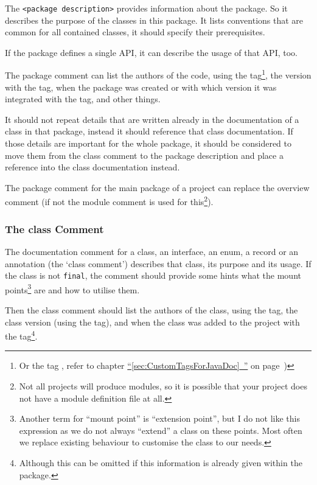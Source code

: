 \documentclass[11pt,a4paper, titlepage, parskip=half, headsepline, footsepline, cleardoublepage=current, headheight=1cm]{scrbook}
\newcommand*{\tqfullvref}[1]{\hyperref[{#1}]{“\ref*{#1}~\nameref*{#1}”} on page~\pageref{#1}}
\begin{document}
The \verb#<package description># provides information about the package. So it describes the purpose of the classes in this package. It lists conventions that are common for all contained classes, it should specify their prerequisites.

If the package defines a single API, it can describe the usage of that API, too. 

The package comment can list the authors of the code, using the  tag\footnote{Or the tag , refer to chapter \tqfullvref{sec:CustomTagsForJavaDoc})}, the version with the  tag, when the package was created or with which version it was integrated with the  tag, and other things.

It should not repeat details that are written already in the documentation of a class in that package, instead it should reference that class documentation. If those details are  important for the whole package, it should be considered to move them from the class comment to the package description and place a reference into the class documentation instead.

The package comment for the main package of a project can replace the overview comment (if not the module comment is used for this\footnote{Not all projects will produce modules, so it is possible that your project does not have a module definition file at all.}).

\subsubsection{The class Comment}\label{sec:ClassComment}
The documentation comment for a class, an interface, an enum, a record or an annotation (the ‘class comment’) describes that class, its purpose and its usage. If the class is not \lstinline|final|, the comment should provide some hints what the mount points\footnote{Another term for “mount point” is “extension point”, but I do not like this expression as we do not always “extend” a class on these points. Most often we replace existing behaviour to customise the class to our needs.} are and how to utilise them.

Then the class comment should list the authors of the class, using the  tag, the class version (using the  tag), and when the class was added to the project with the  tag\footnote{Although this can be omitted if this information is already given within the package.}.
\end{document}
